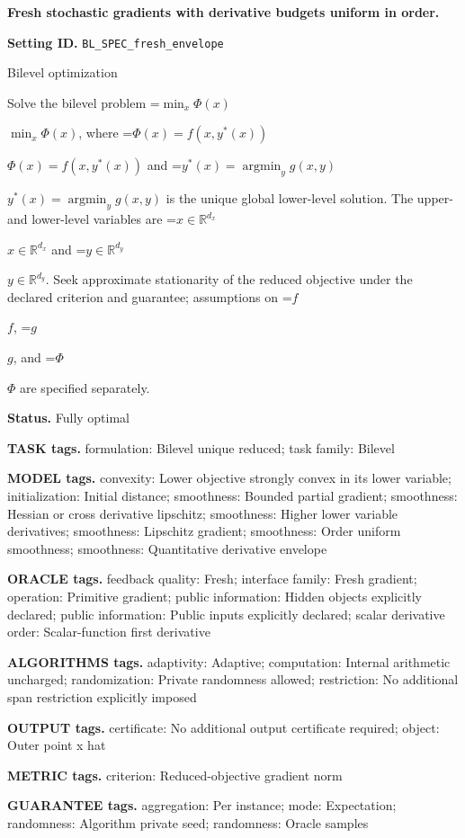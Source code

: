 \documentclass[10pt,a4paper]{article}
\newcommand{\AtlasMath}[1]{\par\begingroup\centering\setbox0=\hbox{$\displaystyle #1$}\ifdim\wd0>1.4\linewidth\typeout{ATLAS WIDE FORMULA: \the\wd0}\fi\ifdim\wd0>\linewidth\resizebox{\linewidth}{!}{\box0}\else\box0\fi\par\endgroup}
\newcommand{\AtlasInlineMath}[1]{\begingroup\setbox0=\hbox{$#1$}\ifdim\wd0>.4\linewidth\endgroup\AtlasMath{#1}\else\endgroup$#1$\fi}
\begin{document}
\raggedright

{\LARGE\bfseries\sffamily\color{AtlasNavy} Fresh stochastic gradients with derivative budgets uniform in order.\par}\vspace{5pt}
\textbf{Setting ID.} \texttt{BL\_\allowbreak{}SPEC\_\allowbreak{}fresh\_\allowbreak{}envelope}

Bilevel optimization

Solve the bilevel problem \AtlasInlineMath{\min_x\Phi(x)}, where \AtlasInlineMath{\Phi(x)=f(x,y^*(x))} and \AtlasInlineMath{y^*(x)=\operatorname*{argmin}_y g(x,y)} is the unique global lower-level solution. The upper- and lower-level variables are \AtlasInlineMath{x\in\mathbb{R}^{d_x}} and \AtlasInlineMath{y\in\mathbb{R}^{d_y}}. Seek approximate stationarity of the reduced objective under the declared criterion and guarantee; assumptions on \AtlasInlineMath{f}, \AtlasInlineMath{g}, and \AtlasInlineMath{\Phi} are specified separately.

\textbf{Status.} Fully optimal

\textbf{TASK tags.} formulation: Bilevel unique reduced; task family: Bilevel

\textbf{MODEL tags.} convexity: Lower objective strongly convex in its lower variable; initialization: Initial distance; smoothness: Bounded partial gradient; smoothness: Hessian or cross derivative lipschitz; smoothness: Higher lower variable derivatives; smoothness: Lipschitz gradient; smoothness: Order uniform smoothness; smoothness: Quantitative derivative envelope

\textbf{ORACLE tags.} feedback quality: Fresh; interface family: Fresh gradient; operation: Primitive gradient; public information: Hidden objects explicitly declared; public information: Public inputs explicitly declared; scalar derivative order: Scalar-function first derivative

\textbf{ALGORITHMS tags.} adaptivity: Adaptive; computation: Internal arithmetic uncharged; randomization: Private randomness allowed; restriction: No additional span restriction explicitly imposed

\textbf{OUTPUT tags.} certificate: No additional output certificate required; object: Outer point x hat

\textbf{METRIC tags.} criterion: Reduced-objective gradient norm

\textbf{GUARANTEE tags.} aggregation: Per instance; mode: Expectation; randomness: Algorithm private seed; randomness: Oracle samples
\end{document}
